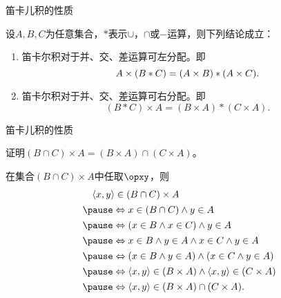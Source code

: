 \begin{frame}{笛卡儿积的性质}
\pause
\begin{defi}
  设$A,B,C$为任意集合，$\ast$表示$\cup$，$\cap$或$-$运算，则下列结论成立：\pause
  \begin{enumerate}
    \item 笛卡尔积对于并、交、差运算可左分配。即 \pause
    $$A \times(B * C)=(A \times B) *(A \times C).\vspace{-4ex}$$ \pause
    \item 笛卡尔积对于并、交、差运算可右分配。即 \pause
    $$(B * C) \times A=(B \times A) *(C \times A).$$
  \end{enumerate}
\end{defi}

\end{frame}

\begin{frame}{笛卡儿积的性质}
\pause
\begin{exam}
  证明$(B \cap C) \times A=(B \times A) \cap(C \times A)$。
\end{exam}\pause
\vspace{1ex}
在集合$(B \cap C) \times A$中任取$\opxy$，\pause 则
\begin{equation*}\begin{array}{ll}
\quad\langle x, y\rangle \in(B \cap C) \times A \\[4pt]\pause
\Leftrightarrow x \in(B \cap C) \wedge y \in A \\[4pt]\pause
\Leftrightarrow(x \in B \wedge x \in C) \wedge y \in A \\[4pt]\pause
\Leftrightarrow x \in B \wedge y \in A \wedge x \in C \wedge y \in A \\[4pt]\pause
\Leftrightarrow(x \in B \wedge y \in A) \wedge(x \in C \wedge y \in A) \\[4pt]\pause
\Leftrightarrow\langle x, y\rangle \in(B \times A) \wedge\langle x, y\rangle \in(C \times A) \\[4pt]\pause
\Leftrightarrow\langle x, y\rangle \in(B \times A) \cap(C \times A).
\end{array}\end{equation*}

\end{frame}


